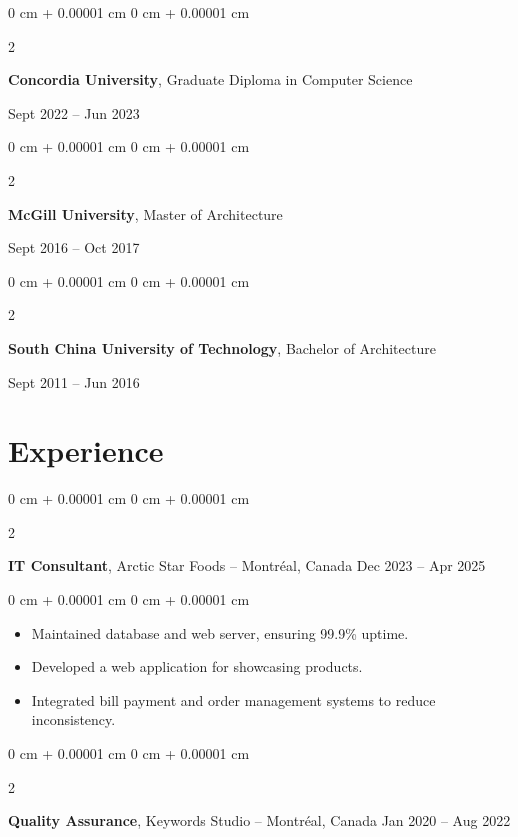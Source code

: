 \documentclass[10pt, letterpaper]{article}
\newenvironment{highlights}{
    \begin{itemize}[
        topsep=0.10 cm,
        parsep=0.10 cm,
        partopsep=0pt,
        itemsep=0pt,
        leftmargin=0 cm + 10pt
    ]
}{
    \end{itemize}
} %
\newenvironment{onecolentry}{
    \begin{adjustwidth}{
        0 cm + 0.00001 cm
    }{
        0 cm + 0.00001 cm
    }
}{
    \end{adjustwidth}
} %
\newenvironment{twocolentry}[2][]{
    \onecolentry
    \def\secondColumn{#2}
    \setcolumnwidth{\fill, 6.5 cm}
    \begin{paracol}{2}
}{
    \switchcolumn \raggedleft \secondColumn
    \end{paracol}
    \endonecolentry
} %
\begin{document}
        \begin{twocolentry}{
            Sept 2022 – Jun 2023
        }
            \textbf{Concordia University}, Graduate Diploma in Computer Science
        \end{twocolentry}

        \begin{twocolentry}{
            Sept 2016 – Oct 2017
        }
            \textbf{McGill University}, Master of Architecture
        \end{twocolentry}

        \begin{twocolentry}{
            Sept 2011 – Jun 2016
        }
            \textbf{South China University of Technology}, Bachelor of Architecture
        \end{twocolentry}


    \section{Experience}

        \begin{twocolentry}{
            Dec 2023 – Apr 2025
        }
            \textbf{IT Consultant}, Arctic Star Foods -- Montréal, Canada\end{twocolentry}

        \vspace{0.10 cm}
        \begin{onecolentry}
            \begin{highlights}
                \item Maintained database and web server, ensuring 99.9\% uptime.
                \item Developed a web application for showcasing products.
                \item Integrated bill payment and order management systems to reduce inconsistency.
            \end{highlights}
        \end{onecolentry}


        \vspace{0.2 cm}

        \begin{twocolentry}{
            Jan 2020 – Aug 2022
        }
            \textbf{Quality Assurance}, Keywords Studio -- Montréal, Canada\end{twocolentry}
\end{document}
